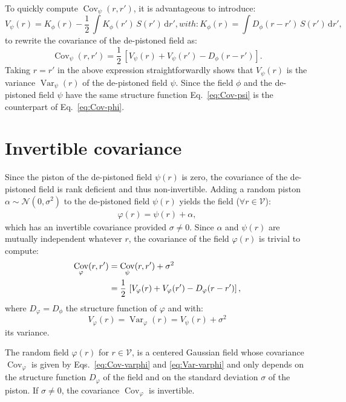 \documentclass{article}
\DeclareMathOperator{\Var}{Var}
\DeclareMathOperator{\Cov}{Cov}
\begin{document}
To quickly compute $\Cov_{\psi}(r,r')$, it is advantageous to introduce:
\begin{subequations}
  \begin{equation}
    \label{eq:C-phi}
    V_{\psi}(r) = K_{\phi}(r)
    - \frac{1}{2}\,\int K_{\phi}(r')\,S(r')\,\mathrm{d}r',
  \end{equation}
  with:
  \begin{equation}
    \label{eq:K-phi}
    K_{\phi}(r) = \int D_{\phi}(r - r')\,S(r')\,\mathrm{d}r',
  \end{equation}
\end{subequations}
to rewrite the covariance of the de-pistoned field as:
\begin{equation}
  \boxed{
    \Cov_{\psi}(r,r')
    = \frac{1}{2}\,\left[
      V_{\psi}(r) + V_{\psi}(r') - D_{\phi}(r - r')
    \right].
  }
  \label{eq:Cov-psi}
\end{equation}
Taking $r = r'$ in the above expression straightforwardly shows that
$V_{\psi}(r)$ is the variance $\Var_{\psi}(r)$ of the de-pistoned field $\psi$.
Since the field $\phi$ and the de-pistoned field $\psi$ have the same structure
function Eq.~\eqref{eq:Cov-psi} is the counterpart of Eq.~\eqref{eq:Cov-phi}.


\section{Invertible covariance}

Since the piston of the de-pistoned field $\psi(r)$ is zero, the covariance of
the de-pistoned field is rank deficient and thus non-invertible. Adding a
random piston $\alpha \sim \mathcal{N}(0,\sigma^{2})$ to the de-pistoned field
$\psi(r)$ yields the field ($\forall r \in \mathcal{V}$):
\begin{align}
  \label{eq:varphi-def}
  \varphi(r) = \psi(r) + \alpha,
\end{align}
which has an invertible covariance provided $\sigma \not= 0$. Since $\alpha$
and $\psi(r)$ are mutually independent whatever $r$, the covariance of the
field $\varphi(r)$ is trivial to compute:
\begin{align}
  \Cov_{\varphi}(r,r')
  &= \Cov_{\psi}(r,r') + \sigma^{2} \notag\\
  &= \frac{1}{2}\,\left[
      V_{\varphi}(r) + V_{\varphi}(r') - D_{\varphi}(r - r')
    \right],
  \label{eq:Cov-varphi}
\end{align}
where $D_{\varphi} = D_{\phi}$ the structure function of $\varphi$ and with:
\begin{equation}
  \label{eq:Var-varphi}
  V_{\varphi}(r) = \Var_{\varphi}(r) = V_{\psi}(r) + \sigma^{2}
\end{equation}
its variance.

The random field $\varphi(r)$ for $r \in \mathcal{V}$, is a centered Gaussian
field whose covariance $\Cov_{\varphi}$ is given by Eqs.~\eqref{eq:Cov-varphi}
and \eqref{eq:Var-varphi} and only depends on the structure function
$D_{\varphi}$ of the field and on the standard deviation $\sigma$ of the
piston. If $\sigma \not= 0$, the covariance $\Cov_{\varphi}$ is invertible.
\end{document}

